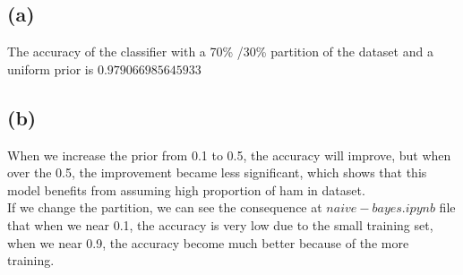 \documentclass[a4paper,11pt]{article} %
\begin{document}
\subsection{(a)}
The accuracy of the classifier with a 70\% /30\% partition of the dataset and a uniform prior is $0.979066985645933$\\
\subsection{(b)}
When we increase the prior from 0.1 to 0.5, the accuracy will improve, but when over the 0.5, the improvement became less significant, which shows that this model benefits from assuming high proportion of ham in dataset.\\
If we change the partition, we can see the consequence at $naive-bayes.ipynb$ file that when we near 0.1, the accuracy is very low due to the small training set, when we near 0.9, the accuracy become much better because of the more training. 








 
\end{document}
